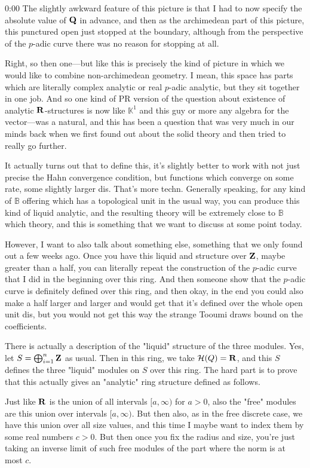 \begin{unfinished}{0:00}
The slightly awkward feature of this picture is that I had to now specify the absolute value of $\mathbf Q$ in advance, and then as the archimedean part of this picture, this punctured open just stopped at the boundary, although from the perspective of the $p$-adic curve there was no reason for stopping at all.

Right, so then one---but like this is precisely the kind of picture in which we would like to combine non-archimedean geometry. I mean, this space has parts which are literally complex analytic or real $p$-adic analytic, but they sit together in one job. And so one kind of PR version of the question about existence of analytic $\mathbf R$-structures is now like $\mathbb{K}^1$ and this guy or more any algebra for the vector---was a natural, and this has been a question that was very much in our minds back when we first found out about the solid theory and then tried to really go further.

It actually turns out that to define this, it's slightly better to work with not just precise the Hahn convergence condition, but functions which converge on some rate, some slightly larger dis. That's more techn. Generally speaking, for any kind of $\mathbb{B}$ offering which has a topological unit in the usual way, you can produce this kind of liquid analytic, and the resulting theory will be extremely close to $\mathbb{B}$ which theory, and this is something that we want to discuss at some point today.

However, I want to also talk about something else, something that we only found out a few weeks ago. Once you have this liquid and structure over $\mathbf Z$, maybe greater than a half, you can literally repeat the construction of the $p$-adic curve that I did in the beginning over this ring. And then someone show that the $p$-adic curve is definitely defined over this ring, and then okay, in the end you could also make a half larger and larger and would get that it's defined over the whole open unit dis, but you would not get this way the strange Tooumi draws bound on the coefficients.

There is actually a description of the "liquid" structure of the three modules. Yes, let $S = \bigoplus_{i=1}^n \mathbf Z$ as usual. Then in this ring, we take $\mathcal{H}(Q) = \mathbf R$, and this $S$ defines the three "liquid" modules on $S$ over this ring. The hard part is to prove that this actually gives an "analytic" ring structure defined as follows.

Just like $\mathbf R$ is the union of all intervals $[a,\infty)$ for $a > 0$, also the "free" modules are this union over intervals $[a,\infty)$. But then also, as in the free discrete case, we have this union over all size values, and this time I maybe want to index them by some real numbers $c > 0$. But then once you fix the radius and size, you're just taking an inverse limit of such free modules of the part where the norm is at most $c$. 


\end{unfinished}
